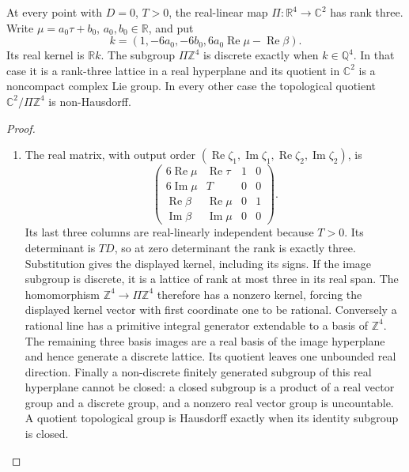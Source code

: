 \begin{proposition}\hypertarget{tag-01QM}{}\label{fam:src:C.3.1}\label{fam:st:C.3.1}

At every point with \(D=0\), \(T>0\), the real-linear map
\(\Pi:\mathbb R^4\to\mathbb C^2\) has rank three. Write
\(\mu=a_0\tau+b_0\), \(a_0,b_0\in\mathbb R\), and put
\[
 k=(1,-6a_0,-6b_0,6a_0\operatorname{Re}\mu-\operatorname{Re}\beta).
\]
Its real kernel is \(\mathbb R k\). The subgroup \(\Pi\mathbb Z^4\) is
discrete exactly when \(k\in\mathbb Q^4\). In that case it is a
rank-three lattice in a real hyperplane and its quotient in \(\mathbb C^2\)
is a noncompact complex Lie group. In every other case the topological
quotient \(\mathbb C^2/\Pi\mathbb Z^4\) is non-Hausdorff.
\end{proposition}


\begin{proof}
\begin{enumerate}[label=\arabic*.,leftmargin=*]
\item The real matrix, with output order
\((\operatorname{Re}\zeta_1,\operatorname{Im}\zeta_1,
\operatorname{Re}\zeta_2,\operatorname{Im}\zeta_2)\), is
\[
 \begin{pmatrix}6\operatorname{Re}\mu&\operatorname{Re}\tau&1&0\\
 6\operatorname{Im}\mu&T&0&0\\
 \operatorname{Re}\beta&\operatorname{Re}\mu&0&1\\
 \operatorname{Im}\beta&\operatorname{Im}\mu&0&0\end{pmatrix}.
\]
Its last three columns are real-linearly independent because \(T>0\).
Its determinant is \(TD\), so at zero determinant the rank is exactly
three. Substitution gives the displayed kernel, including its signs.
If the image subgroup is discrete, it is a lattice of rank at most three
in its real span. The homomorphism \(\mathbb Z^4\to\Pi\mathbb Z^4\)
therefore has a nonzero kernel, forcing the displayed kernel vector with
first coordinate one to be rational. Conversely a rational line has a
primitive integral generator extendable to a basis of \(\mathbb Z^4\).
The remaining three basis images are a real basis of the image hyperplane
and hence generate a discrete lattice. Its quotient leaves one unbounded
real direction. Finally a non-discrete finitely generated subgroup of
this real hyperplane cannot be closed: a closed subgroup is a product of
a real vector group and a discrete group, and a nonzero real vector group
is uncountable. A quotient topological group is Hausdorff exactly when its
identity subgroup is closed.
\end{enumerate}
\end{proof}